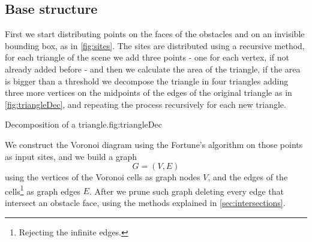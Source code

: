 \documentclass[dissertation.tex]{subfiles}
\begin{document}
\subsection{Base structure}
First we
start distributing points on the faces of the obstacles and on
an invisible bounding box, as in \cref{fig:sites}.
The sites are distributed using a recursive method, for each triangle
of the scene we add three points - one for each
vertex, if not already added before - and then we calculate the area
of the triangle, if the area is bigger than a threshold we decompose
the triangle in four triangles adding three more vertices on the
midpoints of the edges of the original triangle as in
\cref{fig:triangleDec}, and repeating the process recursively for
each new triangle.
\begin{myfig}{Decomposition of a triangle.}{fig:triangleDec}
\end{myfig}

We construct the Voronoi diagram using the Fortune's algorithm
\cite{fortune} on
those points as input sites, and we build a graph
$$G=(V,E)$$
using the vertices
of the Voronoi cells as graph nodes $V$, and the edges of the cells\footnote{Rejecting the
  infinite edges.} as graph edges $E$. After we prune such graph deleting every edge that
intersect an obstacle face, using the methods explained in \cref{sec:intersections}.
\end{document}
